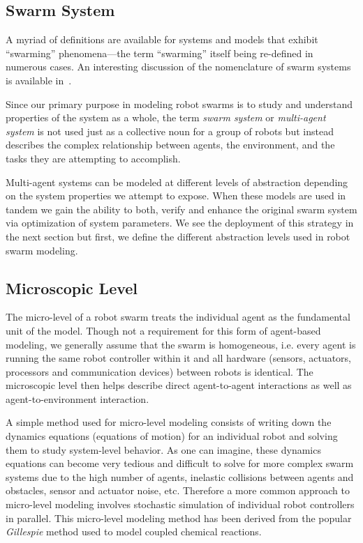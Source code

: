 \documentclass[Main.tex]{subfiles}
\begin{document}
\subsection{Swarm System}
A myriad of definitions are available for systems and models that exhibit ``swarming'' phenomena---the term ``swarming'' itself being re-defined in numerous cases. An interesting discussion of the nomenclature of swarm systems is available in~\cite{Beni2005,Beni2005a}.

Since our primary purpose in modeling robot swarms is to study and understand properties of the system as a whole, the term \emph{swarm system} or \emph{multi-agent system} is not used just as a collective noun for a group of robots but instead describes the complex relationship between agents, the environment, and the tasks they are attempting to accomplish.

Multi-agent systems can be modeled at different levels of abstraction depending on the system properties we attempt to expose. When these models are used in tandem we gain the ability to both, verify and enhance the original swarm system via optimization of system parameters. We see the deployment of this strategy in the next section but first, we define the different abstraction levels used in robot swarm modeling.


\subsection{Microscopic Level}
The micro-level of a robot swarm treats the individual agent as the fundamental unit of the model\cite{Lerman2001a}. Though not a requirement for this form of agent-based modeling, we generally assume that the swarm is homogeneous, i.e. every agent is running the same robot controller within it and all hardware (sensors, actuators, processors and communication devices) between robots is identical. The microscopic level then helps describe direct agent-to-agent interactions as well as agent-to-environment interaction. 

A simple method used for micro-level modeling consists of writing down the dynamics equations (equations of motion) for an individual robot and solving them to study system-level behavior. As one can imagine, these dynamics equations can become very tedious and difficult to solve for more complex swarm systems due to the high number of agents, inelastic collisions between agents and obstacles, sensor and actuator noise, etc. Therefore a more common approach to micro-level modeling involves stochastic simulation of individual robot controllers in parallel. This micro-level modeling method has been derived from the popular \emph{Gillespie} method\cite{Gillespie1976,Gillespie1977} used to model coupled chemical reactions.
\end{document}
